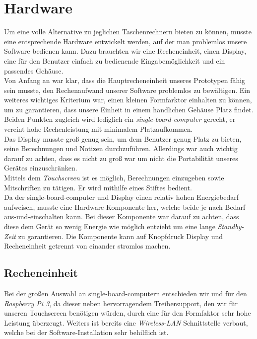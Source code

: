 \section{Hardware}
Um eine volle Alternative zu jeglichen Taschenrechnern bieten zu können, musste eine entsprechende Hardware entwickelt werden, auf der man problemlos unsere Software bedienen kann. Dazu brauchten wir eine Recheneinheit, einen Display, eine für den Benutzer einfach zu bedienende Eingabemöglichkeit und ein passendes Gehäuse.\\

Von Anfang an war klar, dass die Hauptrecheneinheit unseres Prototypen fähig sein musste, den Rechenaufwand unserer Software problemlos zu bewältigen. Ein weiteres wichtiges Kriterium war, einen kleinen Formfarktor einhalten zu können, um zu garantieren, dass unsere Einheit in einem handlichen Gehäuse Platz findet. Beiden Punkten zugleich wird lediglich ein \textit{single-board-computer} gerecht, er vereint hohe Rechenleistung mit minimalem Platzaufkommen.\\

Das Display musste groß genug sein, um dem Benutzer genug Platz zu bieten, seine Berechnungen und Notizen durchzuführen. Allerdings war auch wichtig darauf zu achten, dass es nicht zu groß war um nicht die Portabilität unseres Gerätes einzuschränken.\\

Mittels dem \textit{Touchscreen} ist es möglich, Berechnungen einzugeben sowie Mitschriften zu tätigen. Er wird mithilfe eines Stiftes bedient.\\

Da der single-board-computer und Display einen relativ hohen Energiebedarf aufweisen, musste eine Hardware-Komponente her, welche beide je nach Bedarf aus-und-einschalten kann. Bei dieser Komponente war darauf zu achten, dass diese dem Gerät so wenig Energie wie möglich entzieht um eine lange \textit{Standby-Zeit} zu garantieren. Die Komponente kann auf Knopfdruck Display und Recheneinheit getrennt von einander stromlos machen.\\

\subsection{Recheneinheit}
Bei der großen Auswahl an single-board-computern entschieden wir und für den \textit{Raspberry Pi 3}, da dieser neben hervorragendem Treibersupport, den wir für unseren Touchscreen benötigen würden, durch eine für den Formfaktor sehr hohe Leistung überzeugt. Weiters ist bereits eine \textit{Wireless-LAN} Schnittstelle verbaut, welche bei der Software-Installation sehr behilflich ist.\\



